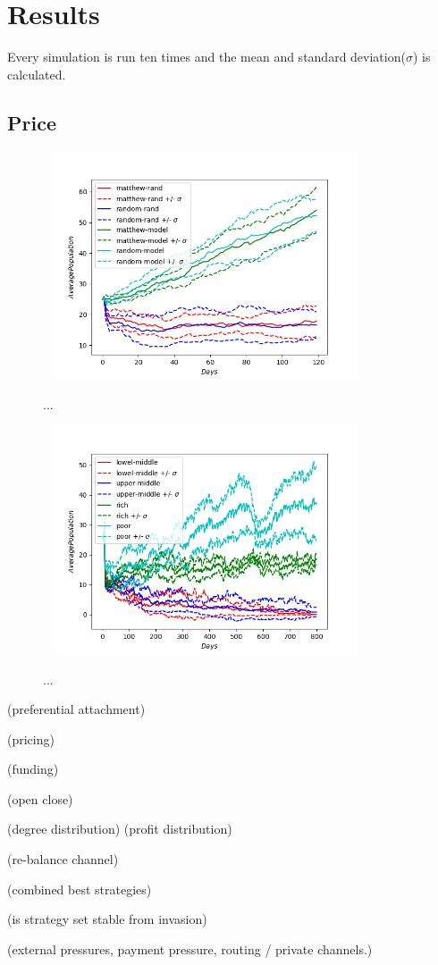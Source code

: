 \chapter{Results}

Every simulation is run ten times and the mean and standard deviation($\sigma$) is calculated. 

\section{Price}

\begin{figure}[!htb]
	\hspace*{-1cm}\ 
	\centering
	\includegraphics[width=9cm]{images/histories_deviation.png}
	\caption{ ...
	}
	\label{fig:fee_curve}
	\hspace*{2mm} 
\end{figure}

\begin{figure}[!htb]
	\hspace*{-1cm}\ 
	\centering
	\includegraphics[width=9cm]{images/histories_deviation_fund.png}
	\caption{ ...
	}
	\label{fig:fee_curve}
	\hspace*{2mm} 
\end{figure}


(preferential attachment)

(pricing)

(funding)

(open close)

(degree distribution)
(profit distribution)

(re-balance channel)

(combined best strategies)

(is strategy set stable from invasion)

(external pressures, payment pressure, routing / private channels.)